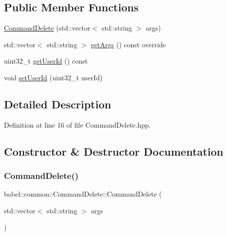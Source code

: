 \subsection*{Public Member Functions}
\begin{DoxyCompactItemize}
\item 
\mbox{\hyperlink{classbabel_1_1common_1_1_command_delete_a249ae3c47533c888d91868b1516858fd}{Command\+Delete}} (std\+::vector$<$ std\+::string $>$ args)
\item 
std\+::vector$<$ std\+::string $>$ \mbox{\hyperlink{classbabel_1_1common_1_1_command_delete_ac57ab78ea9b285a59834ca035d3cb7de}{get\+Args}} () const override
\item 
uint32\+\_\+t \mbox{\hyperlink{classbabel_1_1common_1_1_command_delete_a3a3ab2c36103c3eb329d989f0bd18782}{get\+User\+Id}} () const
\item 
void \mbox{\hyperlink{classbabel_1_1common_1_1_command_delete_a33910e3f5c699a26eac8fab5eb475350}{set\+User\+Id}} (uint32\+\_\+t user\+Id)
\end{DoxyCompactItemize}


\subsection{Detailed Description}


Definition at line 16 of file Command\+Delete.\+hpp.



\subsection{Constructor \& Destructor Documentation}
\mbox{\label{classbabel_1_1common_1_1_command_delete_a249ae3c47533c888d91868b1516858fd}} 
\subsubsection{\texorpdfstring{Command\+Delete()}{CommandDelete()}}
{\footnotesize\ttfamily babel\+::common\+::\+Command\+Delete\+::\+Command\+Delete (\begin{DoxyParamCaption}\item[{std\+::vector$<$ std\+::string $>$}]{args }\end{DoxyParamCaption})}



